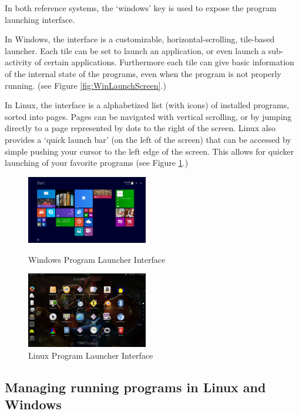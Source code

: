 \documentclass[a4paper]{report}
\begin{document}
In both reference systems, the `windows' key is used to expose the program launching interface.

In Windows, the interface is a customizable, horizontal-scrolling, tile-based launcher. Each tile can be set to launch an application, or even launch a sub-activity of certain applications. Furthermore each tile can give basic information of the internal state of the programs, even when the program is not properly running. (see Figure \ref{fig:WinLaunchScreen}.)


In Linux, the interface is a alphabetized list (with icons) of installed programs, sorted into pages. Pages can be navigated with vertical scrolling, or by jumping directly to a page represented by dots to the right of the screen. Linux also provides a `quick launch bar' (on the left of the screen) that can be accessed by simple pushing your cursor to the left edge of the screen. This allows for quicker launching of your favorite programs (see Figure \ref{fig:LinLaunchScreen}.)


\begin{figure}[ht]
\centering
\begin{minipage}{.5\textwidth}
  \centering
  \includegraphics[width=200px]{images/Windows_Program_Launcher_Screenshot}
  \caption{Windows Program Launcher Interface}
  \label{fig:WinLaunchScreen}
\end{minipage}%
\begin{minipage}{.5\textwidth}
  \centering
  \includegraphics[width=200px]{images/Linux_Program_Launcher_Screenshot}
  \caption{Linux Program Launcher Interface}
  \label{fig:LinLaunchScreen}
\end{minipage}
\end{figure}


\subsection{Managing running programs in Linux and Windows}
\end{document}
